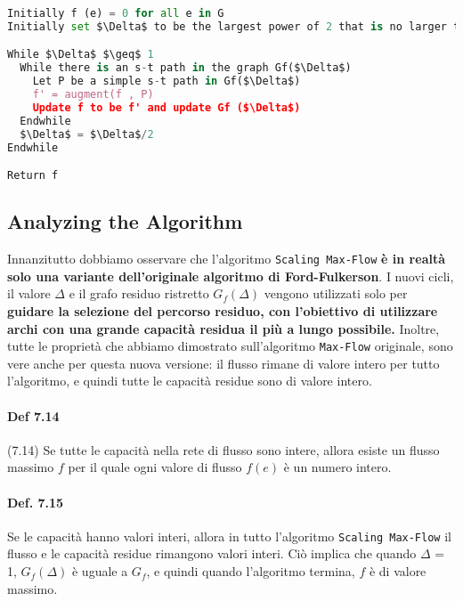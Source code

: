 \begin{lstlisting}[language=Python, mathescape=true]
Initially f (e) = 0 for all e in G
Initially set $\Delta$ to be the largest power of 2 that is no larger than the maximum capacity out of s: $\Delta$ $\leq$ max(e out of s ce)

While $\Delta$ $\geq$ 1
  While there is an s-t path in the graph Gf($\Delta$)
    Let P be a simple s-t path in Gf($\Delta$)
    f' = augment(f , P)
    Update f to be f' and update Gf ($\Delta$)
  Endwhile
  $\Delta$ = $\Delta$/2
Endwhile

Return f
\end{lstlisting}

\subsection{Analyzing the Algorithm}

Innanzitutto dobbiamo osservare che l'algoritmo
\texttt{Scaling\ Max-Flow} \textbf{è in realtà solo una variante
dell'originale algoritmo di Ford-Fulkerson}. I nuovi cicli, il valore
$\Delta$ e il grafo residuo ristretto $G_f(\Delta)$ vengono
utilizzati solo per \textbf{guidare la selezione del percorso residuo,
con l'obiettivo di utilizzare archi con una grande capacità residua il
più a lungo possibile.} Inoltre, tutte le proprietà che abbiamo
dimostrato sull'algoritmo \texttt{Max-Flow} originale, sono vere anche
per questa nuova versione: il flusso rimane di valore intero per tutto
l'algoritmo, e quindi tutte le capacità residue sono di valore intero.

\paragraph{Def 7.14}

\begin{myblockquote}
(7.14) Se tutte le capacità nella rete di flusso sono intere, allora
esiste un flusso massimo $f$ per il quale ogni valore di flusso
$f(e)$ è un numero intero.
\end{myblockquote}

\paragraph{Def. 7.15}

\begin{myblockquote}
Se le capacità hanno valori interi, allora in tutto l'algoritmo
\texttt{Scaling\ Max-Flow} il flusso e le capacità residue rimangono
valori interi. Ciò implica che quando $\Delta$ = 1, $G_f(\Delta)$ è
uguale a $G_f$, e quindi quando l'algoritmo termina, $f$ è di valore
massimo.
\end{myblockquote}

